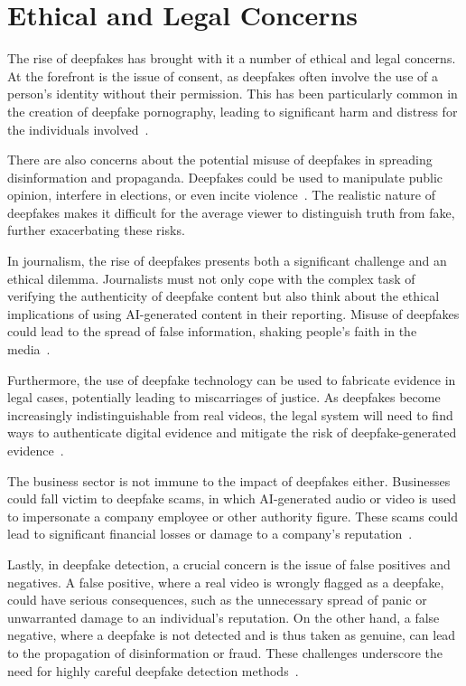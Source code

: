 \section{Ethical and Legal Concerns}\label{chapter:legal}
The rise of deepfakes has brought with it a number of ethical and legal concerns.
At the forefront is the issue of consent, as deepfakes often involve the
use of a person's identity without their permission. This has been
particularly common in the creation of deepfake pornography, leading
to significant harm and distress for the individuals involved~\cite{chesney2019deep}.

There are also concerns about the potential misuse of deepfakes in spreading
disinformation and propaganda. Deepfakes could be used to manipulate public
opinion, interfere in elections, or even incite violence~\cite{deepfakes-business-insider,partnershiponai}.
The realistic nature of deepfakes makes it difficult for the average viewer
to distinguish truth from fake, further exacerbating these risks.

In journalism, the rise of deepfakes presents both a significant
challenge and an ethical dilemma. Journalists must not only cope with
the complex task of verifying the authenticity of deepfake content
but also think about the ethical implications of using \ac{AI}-generated
content in their reporting. Misuse of deepfakes could lead to the spread of
false information, shaking people's faith in the media~\cite{doi:10.1177/2056305120903408}.

Furthermore, the use of deepfake technology can be used to fabricate evidence in
legal cases, potentially leading to miscarriages of justice. As deepfakes become
increasingly indistinguishable from real videos, the legal system will need to
find ways to authenticate digital evidence and mitigate the risk of deepfake-generated
evidence~\cite{chesney2019deep}.

The business sector is not immune to the impact of deepfakes either. Businesses
could fall victim to deepfake scams, in which \ac{AI}-generated audio or video
is used to impersonate a company employee or other authority figure.
These scams could lead to significant financial losses or damage to a
company's reputation~\cite{MUSTAK2023113368}.

Lastly, in deepfake detection, a crucial concern is the issue of
false positives and negatives. A false positive, where a real video is wrongly
flagged as a deepfake, could have serious consequences, such as the unnecessary
spread of panic or unwarranted damage to an individual's reputation. On the
other hand, a false negative, where a deepfake is not detected and is thus
taken as genuine, can lead to the propagation of disinformation or fraud.
These challenges underscore the need for highly careful deepfake detection methods~\cite{roessler2019faceforensicspp}.

